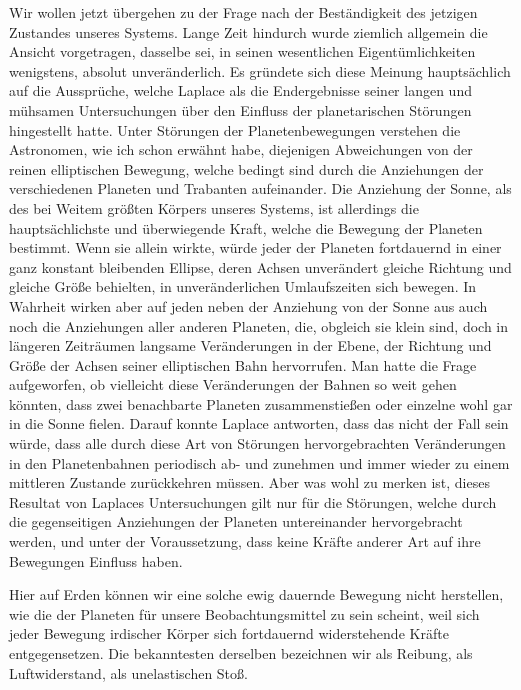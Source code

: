 \documentclass[a4paper, 11pt, oneside, german]{article}
\begin{document}
Wir wollen jetzt übergehen zu der Frage nach der Beständigkeit des jetzigen Zustandes unseres Systems. Lange Zeit hindurch wurde ziemlich allgemein die Ansicht vorgetragen, dasselbe sei, in seinen wesentlichen Eigentümlichkeiten wenigstens, absolut unveränderlich. Es gründete sich diese Meinung hauptsächlich auf die Aussprüche, welche Laplace als die Endergebnisse seiner langen und mühsamen Untersuchungen über den Einfluss der planetarischen Störungen hingestellt hatte. Unter Störungen der Planetenbewegungen verstehen die Astronomen, wie ich schon erwähnt habe, diejenigen Abweichungen von der reinen elliptischen Bewegung, welche bedingt sind durch die Anziehungen der verschiedenen Planeten und Trabanten aufeinander. Die Anziehung der Sonne, als des bei Weitem größten Körpers unseres Systems, ist allerdings die hauptsächlichste und überwiegende Kraft, welche die Bewegung der Planeten bestimmt. Wenn sie allein wirkte, würde jeder der Planeten fortdauernd in einer ganz konstant bleibenden Ellipse, deren Achsen unverändert gleiche Richtung und gleiche Größe behielten, in unveränderlichen Umlaufszeiten sich bewegen. In Wahrheit wirken aber auf jeden neben der Anziehung von der Sonne aus auch noch die Anziehungen aller anderen Planeten, die, obgleich sie klein sind, doch in längeren Zeiträumen langsame Veränderungen in der Ebene, der Richtung und Größe der Achsen seiner elliptischen Bahn hervorrufen. Man hatte die Frage aufgeworfen, ob vielleicht diese Veränderungen der Bahnen so weit gehen könnten, dass zwei benachbarte Planeten zusammenstießen oder einzelne wohl gar in die Sonne fielen. Darauf konnte Laplace antworten, dass das nicht der Fall sein würde, dass alle durch diese Art von Störungen hervorgebrachten Veränderungen in den Planetenbahnen periodisch ab- und zunehmen und immer wieder zu einem mittleren Zustande zurückkehren müssen. Aber was wohl zu merken ist, dieses Resultat von Laplaces Untersuchungen gilt nur für die Störungen, welche durch die gegenseitigen Anziehungen der Planeten untereinander hervorgebracht werden, und unter der Voraussetzung, dass keine Kräfte anderer Art auf ihre Bewegungen Einfluss haben.

Hier auf Erden können wir eine solche ewig dauernde Bewegung nicht herstellen, wie die der Planeten für unsere Beobachtungsmittel zu sein scheint, weil sich jeder Bewegung irdischer Körper sich fortdauernd widerstehende Kräfte entgegensetzen. Die bekanntesten derselben bezeichnen wir als Reibung, als Luftwiderstand, als unelastischen Stoß.
\end{document}
